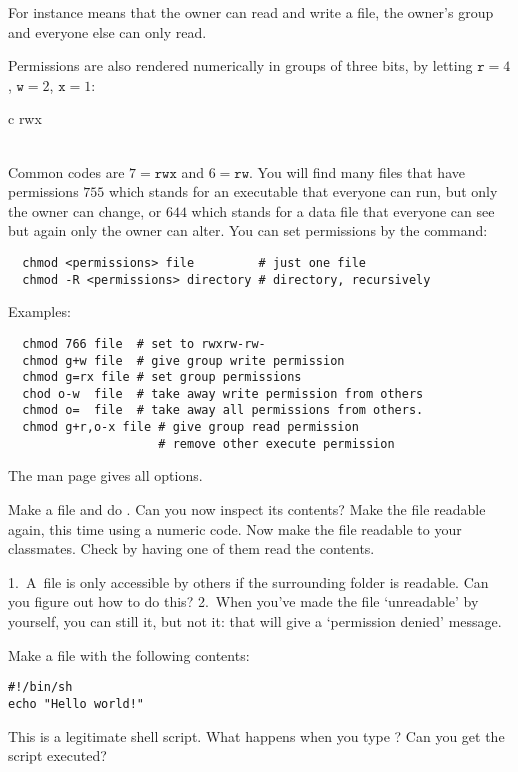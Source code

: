 For instance
 means that the owner can read and write a file, the owner's
group and everyone else can only read. 

Permissions are also rendered
numerically in groups of three bits, by letting
$\mathtt{r}=4$, $\mathtt{w}=2$, $\mathtt{x}=1$:

\begin{fntable}{c}
 rwx\\  \\ 
\end{fntable}

Common codes are $7=\mathtt{rwx}$ and $6=\mathtt{rw}$. You will find
many files that have permissions $755$ which stands for an executable
that everyone can run, but only the owner can change, or $644$ which
stands for a data file that everyone can see but again only the owner
can alter. You can set permissions by the  command:
\begin{lstlisting}
  chmod <permissions> file         # just one file
  chmod -R <permissions> directory # directory, recursively
\end{lstlisting}
Examples:
\begin{lstlisting}
  chmod 766 file  # set to rwxrw-rw-
  chmod g+w file  # give group write permission
  chmod g=rx file # set group permissions
  chod o-w  file  # take away write permission from others
  chmod o=  file  # take away all permissions from others.
  chmod g+r,o-x file # give group read permission
                     # remove other execute permission
\end{lstlisting}
The man page gives all options.

\begin{exercise}
  Make a file  and do . Can you now inspect
  its contents? Make the file readable again, this time using a
  numeric code. Now make the file readable to your classmates. Check
  by having one of them read the contents.
\end{exercise}
\begin{outcome}
  1.~A~file is only accessible by others if the surrounding folder is
  readable. Can you figure out how to do this? 2.~When you've made the
  file `unreadable' by yourself, you can still  it, but not
   it: that will give a `permission denied' message.
\end{outcome}

Make a file  with the following contents:
\begin{lstlisting}
#!/bin/sh
echo "Hello world!"
\end{lstlisting}
This is a legitimate shell script. What happens when you type
? Can you get the script executed?

